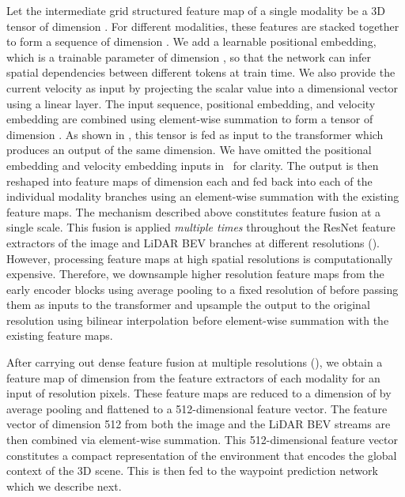 \documentclass[final]{cvpr}
\begin{document}
Let the intermediate grid structured feature map of a single modality be a 3D tensor of dimension . For  different modalities, these features are stacked together to form a sequence of dimension . We add a learnable positional embedding, which is a trainable parameter of dimension , so that the network can infer spatial dependencies between different tokens at train time. We also provide the current velocity as input by projecting the scalar value into a  dimensional vector using a linear layer. The input sequence, positional embedding, and velocity embedding are combined using element-wise summation to form a tensor of dimension . As shown in , this tensor is fed as input to the transformer which produces an output of the same dimension. We have omitted the positional embedding and velocity embedding inputs in~ for clarity. The output is then reshaped into  feature maps of dimension  each and fed back into each of the individual modality branches using an element-wise summation with the existing feature maps. The mechanism described above constitutes feature fusion at a single scale. This fusion is applied \textit{multiple times} throughout the ResNet feature extractors of the image and LiDAR BEV branches at different resolutions (). However, processing feature maps at high spatial resolutions is computationally expensive. Therefore, we downsample higher resolution feature maps from the early encoder blocks using average pooling to a fixed resolution of  before passing them as inputs to the transformer and upsample the output to the original resolution using bilinear interpolation before element-wise summation with the existing feature maps.

After carrying out dense feature fusion at multiple resolutions (), we obtain a feature map of dimension  from the feature extractors of each modality for an input of resolution  pixels. These feature maps are reduced to a dimension of  by average pooling and flattened to a 512-dimensional feature vector. The feature vector of dimension 512 from both the image and the LiDAR BEV streams are then combined via element-wise summation. This 512-dimensional feature vector constitutes a compact representation of the environment that encodes the global context of the 3D scene. This is then fed to the waypoint prediction network which we describe next.
\end{document}
